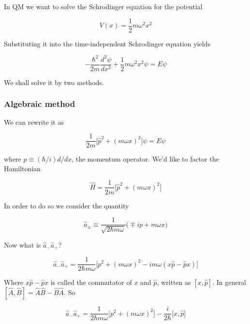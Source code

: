 \documentclass[a4paper]{article}
\begin{document}
In QM we want to solve the Schrodinger equation for the potential

\begin{equation}
	V(x)=\frac{1}{2}m\omega^2x^2
\end{equation}

Substituting it into the time-independent Schrodinger equation yields

\begin{equation}
	-\frac{\hbar^2}{2m}\frac{d^2\psi}{dx^2}+\frac{1}{2}m\omega^2x^2\psi=E\psi
\end{equation}

We shall solve it by two methods.

\subsubsection{Algebraic method}

We can rewrite it as

\begin{equation}
	\frac{1}{2m}\big[\hat{p}^2+(m\omega x)^2\big]\psi=E\psi
\end{equation}

where $\hat{p}\equiv (\hbar/i)d/dx$, the momentum operator. We'd like to factor the Hamiltonian

\begin{equation}
	\hat{H}=\frac{1}{2m}\big[\hat{p}^2+(m\omega x)^2\big]
\end{equation}

In order to do so we consider the quantity

\begin{equation}
	\hat{a}_{\pm}\equiv \frac{1}{\sqrt{2\hbar m\omega}}\big(\mp ip + m\omega x\big)
\end{equation}

Now what is $\hat{a}_{-}\hat{a}_{+}$?

\begin{equation}
	\hat{a}_{-}\hat{a}_{+}=\frac{1}{2\hbar m\omega}\big[p^2+(m\omega x)^2-im\omega(x\hat{p}-\hat{p}x)\big]
\end{equation}

Where $x\hat{p}-\hat{p}x$ is called the commutator of $x$ and $\hat{p}$, written as $[x,\hat{p}]$. In general $[\hat{A},\hat{B}]=\hat{A}\hat{B}-\hat{B}\hat{A}$. So

\begin{equation}
	\hat{a}_{-}\hat{a}_{+}=\frac{1}{2\hbar m\omega}\big[p^2+(m\omega x)^2\big]-\frac{i}{2\hbar}\big[x, \hat{p}\big]
\end{equation}
\end{document}
